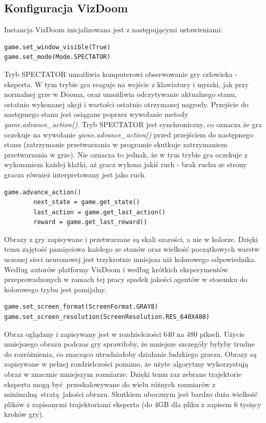 \documentclass[polish,master,a4paper,oneside]{ppfcmthesis}
\begin{document}
\subsection{Konfiguracja VizDoom}
Instancja VizDoom inicjalizowana jest z następującymi ustawieniami:

\begin{lstlisting}[language=iPython]
game.set_window_visible(True)
game.set_mode(Mode.SPECTATOR)
\end{lstlisting}

Tryb SPECTATOR umożliwia komputerowi obserwowanie gry człowieka - eksperta. W tym trybie gra reaguje na wejście z klawiatury i myszki, jak przy normalnej grze w Dooma, oraz umożliwia odczytywanie aktualnego stanu, ostatnio wykonanej akcji i wartości ostatnio otrzymanej nagrody. Przejście do następnego stanu jest osiągane poprzez wywołanie metody \textit{game.advance\_action()}. Tryb SPECTATOR jest synchroniczny, co oznacza że gra oczekuje na wywołanie \textit{game.advance\_action()} przed przejściem do następnego stanu (zatrzymanie przetwarzania w programie skutkuje zatrzymaniem przetwarzania w grze). Nie oznacza to jednak, że w tym trybie gra oczekuje z wykonaniem każdej klatki, aż gracz wykona jakiś ruch - brak ruchu ze strony gracza również interpretowany jest jako ruch.

\begin{lstlisting}[language=iPython]
 	game.advance_action()
        next_state = game.get_state()
        last_action = game.get_last_action()
        reward = game.get_last_reward()
\end{lstlisting}

Obrazy z gry zapisywane i przetwarzane są skali szarości, a nie w kolorze. Dzięki temu zajętość pamięciowa każdego ze stanów oraz wielkość początkowych warstw uczonej sieci neuronowej jest trzykrotnie mniejsza niż kolorowego odpowiednika. Według autorów platformy VizDoom i według krótkich eksperymentów przeprowadzonych w ramach tej pracy spadek jakości agentów w stosunku do kolorowego trybu jest pomijalny.
\begin{lstlisting}[language=iPython]
game.set_screen_format(ScreenFormat.GRAY8)
game.set_screen_resolution(ScreenResolution.RES_640X480)
\end{lstlisting}

Obraz oglądany i zapisywany jest w rozdzielczości 640 na 480 pikseli. Użycie mniejszego obrazu podczas gry sprawiłoby, że mniejsze szczegóły byłyby trudne do rozróżnienia, co znacząco utrudniałoby działanie ludzkiego gracza. Obrazy są zapisywane w pełnej rozdzielczości pomimo, że użyte algorytmy wykorzystują obraz w znacznie mniejszym rozmiarze. Dzięki temu raz zebrane trajektorie eksperta mogą być przeskalowywane do wielu różnych rozmiarów z minimalną stratą jakości obrazu. Skutkiem ubocznym jest bardzo duża wielkość plików z zapisanymi trajektoriami eksperta (do 4GB dla pliku z zapisem 6 tysięcy kroków gry).
\end{document}
